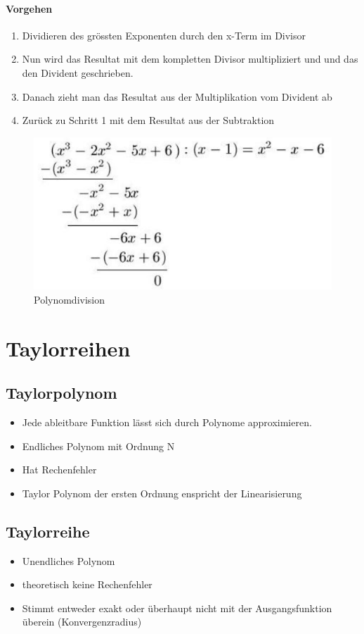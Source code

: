 \paragraph{Vorgehen}
\begin{enumerate}
	\item Dividieren des grössten Exponenten durch den x-Term im Divisor
	\item Nun wird das Resultat mit dem kompletten Divisor multipliziert und und das den Divident geschrieben.
	\item Danach zieht man das Resultat aus der Multiplikation vom Divident ab
	\item Zurück zu Schritt 1 mit dem Resultat aus der Subtraktion
\end{enumerate}
\begin{figure}[h]
	\centering
	\includegraphics[width=0.3\linewidth]{images/polynomdivision}
	\caption{Polynomdivision}
\end{figure}

 
\section{Taylorreihen}
\subsection{Taylorpolynom}

\begin{itemize}
	\item Jede ableitbare Funktion lässt sich durch Polynome approximieren.  
	\item Endliches Polynom mit Ordnung N
	\item Hat Rechenfehler
	\item Taylor Polynom der ersten Ordnung enspricht der Linearisierung
\end{itemize}

\subsection{Taylorreihe}
\begin{itemize}
	\item Unendliches Polynom 
	\item theoretisch keine Rechenfehler
	\item Stimmt entweder exakt oder überhaupt nicht mit der Ausgangsfunktion überein (Konvergenzradius)
\end{itemize}

